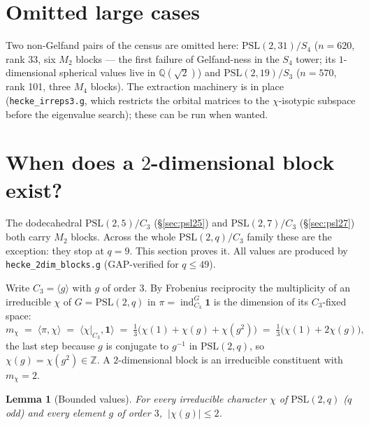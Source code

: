 \documentclass[11pt]{article}
\newtheorem{lemma}[theorem]{Lemma}
\theoremstyle{remark}
\newcommand{\Q}{\mathbb{Q}}
\newcommand{\Z}{\mathbb{Z}}
\newcommand{\ind}{\operatorname{ind}}
\begin{document}
\section{Omitted large cases}\label{sec:omitted}

Two non-Gelfand pairs of the census are omitted here:
$\mathrm{PSL}(2,31)/S_4$ ($n=620$, rank 33, six $M_2$ blocks --- the
first failure of Gelfand-ness in the $S_4$ tower; its $1$-dimensional
spherical values live in $\Q(\sqrt2)$) and $\mathrm{PSL}(2,19)/S_3$
($n=570$, rank 101, three $M_4$ blocks). The extraction machinery is in
place (\texttt{hecke\_irreps3.g}, which restricts the orbital matrices to
the $\chi$-isotypic subspace before the eigenvalue search); these can be
run when wanted.

\section{When does a $2$-dimensional block exist?}\label{sec:2dim}

The dodecahedral $\mathrm{PSL}(2,5)/C_3$ (\S\ref{sec:psl25}) and
$\mathrm{PSL}(2,7)/C_3$ (\S\ref{sec:psl27}) both carry $M_2$ blocks. Across
the whole $\mathrm{PSL}(2,q)/C_3$ family these are the exception: they stop
at $q=9$. This section proves it. All values are produced by
\texttt{hecke\_2dim\_blocks.g} (GAP-verified for $q\le 49$).

Write $C_3=\langle g\rangle$ with $g$ of order $3$. By Frobenius reciprocity
the multiplicity of an irreducible $\chi$ of $G=\mathrm{PSL}(2,q)$ in
$\pi=\ind_{C_3}^G\mathbf1$ is the dimension of its $C_3$-fixed space:
\begin{equation}\label{eq:mfix}
  m_\chi \;=\; \langle \pi,\chi\rangle
         \;=\; \langle \chi|_{C_3},\mathbf1\rangle
         \;=\; \tfrac13\bigl(\chi(1)+\chi(g)+\chi(g^2)\bigr)
         \;=\; \tfrac13\bigl(\chi(1)+2\chi(g)\bigr),
\end{equation}
the last step because $g$ is conjugate to $g^{-1}$ in $\mathrm{PSL}(2,q)$, so
$\chi(g)=\chi(g^2)\in\Z$. A $2$-dimensional block is an irreducible
constituent with $m_\chi=2$.

\begin{lemma}[Bounded values]\label{lem:bounded}
For every irreducible character $\chi$ of $\mathrm{PSL}(2,q)$ ($q$ odd) and
every element $g$ of order $3$, $\ |\chi(g)|\le 2$.
\end{lemma}
\end{document}
